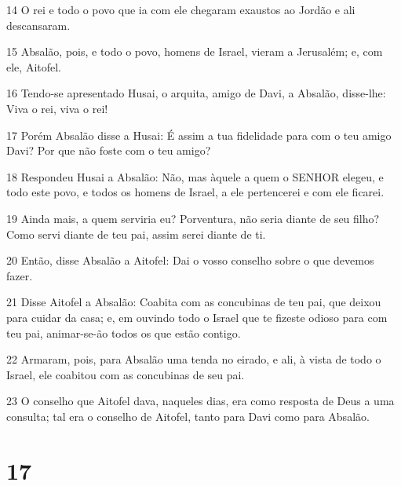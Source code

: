 \par 14 O rei e todo o povo que ia com ele chegaram exaustos ao Jordão e ali descansaram.
\par 15 Absalão, pois, e todo o povo, homens de Israel, vieram a Jerusalém; e, com ele, Aitofel.
\par 16 Tendo-se apresentado Husai, o arquita, amigo de Davi, a Absalão, disse-lhe: Viva o rei, viva o rei!
\par 17 Porém Absalão disse a Husai: É assim a tua fidelidade para com o teu amigo Davi? Por que não foste com o teu amigo?
\par 18 Respondeu Husai a Absalão: Não, mas àquele a quem o SENHOR elegeu, e todo este povo, e todos os homens de Israel, a ele pertencerei e com ele ficarei.
\par 19 Ainda mais, a quem serviria eu? Porventura, não seria diante de seu filho? Como servi diante de teu pai, assim serei diante de ti.
\par 20 Então, disse Absalão a Aitofel: Dai o vosso conselho sobre o que devemos fazer.
\par 21 Disse Aitofel a Absalão: Coabita com as concubinas de teu pai, que deixou para cuidar da casa; e, em ouvindo todo o Israel que te fizeste odioso para com teu pai, animar-se-ão todos os que estão contigo.
\par 22 Armaram, pois, para Absalão uma tenda no eirado, e ali, à vista de todo o Israel, ele coabitou com as concubinas de seu pai.
\par 23 O conselho que Aitofel dava, naqueles dias, era como resposta de Deus a uma consulta; tal era o conselho de Aitofel, tanto para Davi como para Absalão.

\chapter{17}

